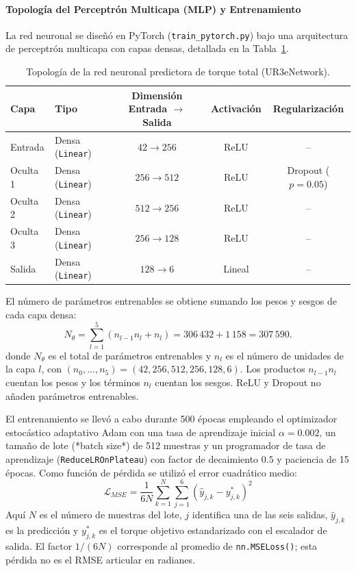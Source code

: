 \documentclass[12pt]{article}
\begin{document}
\paragraph{Topología del Perceptrón Multicapa (MLP) y Entrenamiento}
La red neuronal se diseñó en PyTorch (\texttt{train\_pytorch.py}) bajo una arquitectura de perceptrón multicapa con capas densas, detallada en la Tabla~\ref{tab:mlp_architecture}.

\begin{table}[htbp]
\centering
\footnotesize
\caption{Topología de la red neuronal predictora de torque total (UR3eNetwork).}
\label{tab:mlp_architecture}
\begin{tabularx}{\textwidth}{l >{\raggedright\arraybackslash}X c c c}
\toprule
\textbf{Capa} & \textbf{Tipo} & \textbf{Dimensión Entrada $\to$ Salida} & \textbf{Activación} & \textbf{Regularización} \\
\midrule
Entrada & Densa (\texttt{Linear}) & $42 \to 256$ & ReLU & -- \\
Oculta 1 & Densa (\texttt{Linear}) & $256 \to 512$ & ReLU & Dropout ($p=0.05$) \\
Oculta 2 & Densa (\texttt{Linear}) & $512 \to 256$ & ReLU & -- \\
Oculta 3 & Densa (\texttt{Linear}) & $256 \to 128$ & ReLU & -- \\
Salida & Densa (\texttt{Linear}) & $128 \to 6$ & Lineal & -- \\
\bottomrule
\end{tabularx}
\end{table}

El número de parámetros entrenables se obtiene sumando los pesos y sesgos de cada capa densa:
\begin{equation}
    N_{\theta}=\sum_{l=1}^{5}(n_{l-1}n_l+n_l)
    =306\,432+1\,158=307\,590.
    \label{eq:conteo_parametros_mlp}
\end{equation}
donde $N_{\theta}$ es el total de parámetros entrenables y $n_l$ es el número de unidades de la capa $l$, con $(n_0,\ldots,n_5)=(42,256,512,256,128,6)$. Los productos $n_{l-1}n_l$ cuentan los pesos y los términos $n_l$ cuentan los sesgos. ReLU y Dropout no añaden parámetros entrenables.


El entrenamiento se llevó a cabo durante 500 épocas empleando el optimizador estocástico adaptativo Adam \cite{kingma2014adam} con una tasa de aprendizaje inicial $\alpha = 0.002$, un tamaño de lote (*batch size*) de 512 muestras y un programador de tasa de aprendizaje (\texttt{ReduceLROnPlateau}) con factor de decaimiento $0.5$ y paciencia de 15 épocas. Como función de pérdida se utilizó el error cuadrático medio:
\begin{equation}
    \mathcal{L}_{MSE} = \frac{1}{6N} \sum_{k=1}^N \sum_{j=1}^6 \left( \hat{y}_{j,k} - y^*_{j,k} \right)^2
    \label{eq:mse_loss}
\end{equation}
Aquí $N$ es el número de muestras del lote, $j$ identifica una de las seis salidas, $\hat{y}_{j,k}$ es la predicción y $y^*_{j,k}$ es el torque objetivo estandarizado con el escalador de salida. El factor $1/(6N)$ corresponde al promedio de \texttt{nn.MSELoss()}; esta pérdida no es el RMSE articular en radianes.
\end{document}
